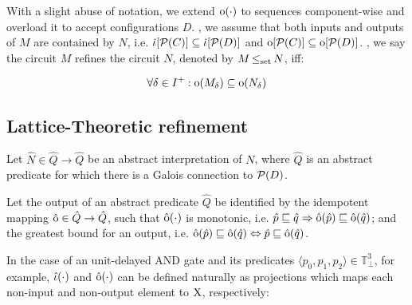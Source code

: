 

With a slight abuse of notation, we extend $\operatorname{\mathrm{o}}(\cdot)$ to sequences component-wise and overload it to accept configurations $D$. , we assume that both inputs and outputs of $M$ are contained by $N$, i.e. $\operatorname{\dot{\iota}}[\mathcal{P}(C)] \subseteq \operatorname{\dot{\iota}}[\mathcal{P}(D)]$ and $\operatorname{\mathrm{o}}[\mathcal{P}(C)] \subseteq \operatorname{\mathrm{o}}[\mathcal{P}(D)]$. , we say the circuit $M$ refines the circuit $N$, denoted by $M \operatorname{\leq_{\textrm{set}}} N$, iff:

\begin{equation*}
\forall \delta \in I^{+} : \operatorname{\mathrm{o}}(M_{\delta}) \subseteq \operatorname{\mathrm{o}}(N_{\delta})
\end{equation*}

\subsection{Lattice-Theoretic refinement}

Let $\hat N \in \hat Q \rightarrow \hat Q$ be an abstract interpretation of $N$, where $\hat Q$ is an abstract predicate for which there is a Galois connection to $\mathcal{P}(D)$.

Let the output of an abstract predicate $\hat Q$ be identified by the idempotent mapping $\operatorname{\hat{\mathrm{o}}} \in \hat Q \rightarrow \hat Q$, such that $\operatorname{\hat{\mathrm{o}}}(\cdot)$ is monotonic, i.e. $\hat p \sqsubseteq \hat q \Rightarrow \operatorname{\hat{\mathrm{o}}}(\hat p) \sqsubseteq \operatorname{\hat{\mathrm{o}}}(\hat q)$; and the greatest bound for an output, i.e. $\operatorname{\hat{\mathrm{o}}}(\hat p) \sqsubseteq \operatorname{\hat{\mathrm{o}}}(\hat q) \Leftrightarrow \hat p \sqsubseteq \operatorname{\hat{\mathrm{o}}}(\hat q)$. 



In the case of an unit-delayed AND gate and its predicates $\langle p_{0}, p_{1}, p_{2} \rangle \in \mathbb{T}_{\bot}^{3}$, for example, $\operatorname{\hat{\iota}}(\cdot)$ and $\operatorname{\hat{\mathrm{o}}}(\cdot)$ can be defined naturally as projections which maps each non-input and non-output element to $\mathrm{X}$, respectively:

